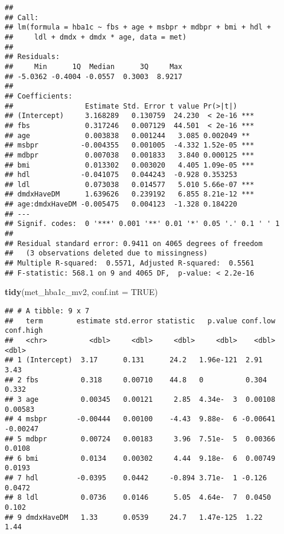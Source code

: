 \documentclass[
]{article}
\newenvironment{Shaded}{\begin{snugshade}}{\end{snugshade}}
\newcommand{\AttributeTok}[1]{\textcolor[rgb]{0.13,0.29,0.53}{#1}}
\newcommand{\ConstantTok}[1]{\textcolor[rgb]{0.56,0.35,0.01}{#1}}
\newcommand{\FunctionTok}[1]{\textcolor[rgb]{0.13,0.29,0.53}{\textbf{#1}}}
\newcommand{\NormalTok}[1]{#1}
\begin{document}
\begin{verbatim}
## 
## Call:
## lm(formula = hba1c ~ fbs + age + msbpr + mdbpr + bmi + hdl + 
##     ldl + dmdx + dmdx * age, data = met)
## 
## Residuals:
##     Min      1Q  Median      3Q     Max 
## -5.0362 -0.4004 -0.0557  0.3003  8.9217 
## 
## Coefficients:
##                 Estimate Std. Error t value Pr(>|t|)    
## (Intercept)     3.168289   0.130759  24.230  < 2e-16 ***
## fbs             0.317246   0.007129  44.501  < 2e-16 ***
## age             0.003838   0.001244   3.085 0.002049 ** 
## msbpr          -0.004355   0.001005  -4.332 1.52e-05 ***
## mdbpr           0.007038   0.001833   3.840 0.000125 ***
## bmi             0.013302   0.003020   4.405 1.09e-05 ***
## hdl            -0.041075   0.044243  -0.928 0.353253    
## ldl             0.073038   0.014577   5.010 5.66e-07 ***
## dmdxHaveDM      1.639626   0.239192   6.855 8.21e-12 ***
## age:dmdxHaveDM -0.005475   0.004123  -1.328 0.184220    
## ---
## Signif. codes:  0 '***' 0.001 '**' 0.01 '*' 0.05 '.' 0.1 ' ' 1
## 
## Residual standard error: 0.9411 on 4065 degrees of freedom
##   (3 observations deleted due to missingness)
## Multiple R-squared:  0.5571, Adjusted R-squared:  0.5561 
## F-statistic: 568.1 on 9 and 4065 DF,  p-value: < 2.2e-16
\end{verbatim}

\begin{Shaded}
\begin{Highlighting}[]
\FunctionTok{tidy}\NormalTok{(met\_hba1c\_mv2, }\AttributeTok{conf.int =} \ConstantTok{TRUE}\NormalTok{)}
\end{Highlighting}
\end{Shaded}

\begin{verbatim}
## # A tibble: 9 x 7
##   term        estimate std.error statistic   p.value conf.low conf.high
##   <chr>          <dbl>     <dbl>     <dbl>     <dbl>    <dbl>     <dbl>
## 1 (Intercept)  3.17      0.131      24.2   1.96e-121  2.91      3.43   
## 2 fbs          0.318     0.00710    44.8   0          0.304     0.332  
## 3 age          0.00345   0.00121     2.85  4.34e-  3  0.00108   0.00583
## 4 msbpr       -0.00444   0.00100    -4.43  9.88e-  6 -0.00641  -0.00247
## 5 mdbpr        0.00724   0.00183     3.96  7.51e-  5  0.00366   0.0108 
## 6 bmi          0.0134    0.00302     4.44  9.18e-  6  0.00749   0.0193 
## 7 hdl         -0.0395    0.0442     -0.894 3.71e-  1 -0.126     0.0472 
## 8 ldl          0.0736    0.0146      5.05  4.64e-  7  0.0450    0.102  
## 9 dmdxHaveDM   1.33      0.0539     24.7   1.47e-125  1.22      1.44
\end{verbatim}
\end{document}
